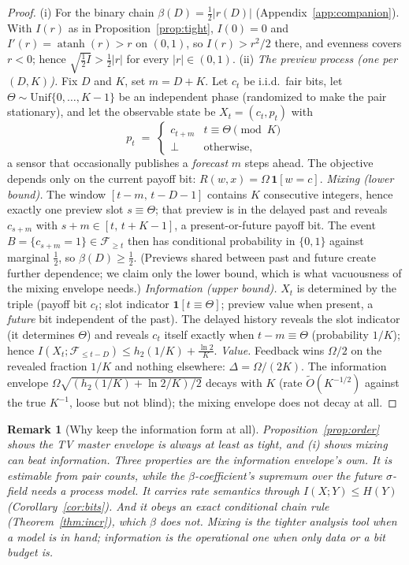 \documentclass[11pt]{article}
\newtheorem{remark}[theorem]{Remark}
\begin{document}
\begin{proof}
(i) For the binary chain $\beta(D)=\tfrac12 |r(D)|$
(Appendix~\ref{app:companion}). With $I(r)$ as in
Proposition~\ref{prop:tight}, $I(0)=0$ and
$I'(r)=\operatorname{atanh}(r)>r$ on $(0,1)$, so $I(r)>r^2/2$ there, and
evenness covers $r<0$; hence $\sqrt{\tfrac12 I}>\tfrac12|r|$ for every
$|r|\in(0,1)$.
(ii) \emph{The preview process (one per $(D,K)$).} Fix $D$ and $K$, set
$m=D+K$. Let $c_t$ be i.i.d.\ fair bits, let
$\Theta\sim\mathrm{Unif}\{0,\dots,K{-}1\}$ be an independent phase
(randomized to make the pair stationary), and let the observable state be
$X_t=(c_t,p_t)$ with
\[
p_t \;=\; \begin{cases} c_{t+m} & t\equiv\Theta \pmod K\\
\bot & \text{otherwise},\end{cases}
\]
a sensor that occasionally publishes a \emph{forecast} $m$ steps ahead. The
objective depends only on the current payoff bit:
$R(w,x)=\Omega\,\mathbf 1[w=c]$.
\emph{Mixing (lower bound).} The window $[t-m,\,t-D-1]$ contains $K$
consecutive integers, hence exactly one preview slot
$s\equiv\Theta$; that preview is in the
delayed past and reveals $c_{s+m}$ with $s+m\in[t,\,t+K-1]$, a
present-or-future payoff bit. The event $B=\{c_{s+m}=1\}\in\mathcal F_{\ge t}$
then has conditional probability in $\{0,1\}$ against marginal $\tfrac12$,
so $\beta(D)\ge\tfrac12$. (Previews shared between past and future create
further dependence; we claim only the lower bound, which is what vacuousness
of the mixing envelope needs.)
\emph{Information (upper bound).} $X_t$ is determined by the triple
(payoff bit $c_t$; slot indicator $\mathbf 1[t\equiv\Theta]$; preview value
when present, a \emph{future} bit independent of the past). The delayed
history reveals the slot indicator (it determines $\Theta$) and reveals
$c_t$ itself exactly when $t-m\equiv\Theta$ (probability $1/K$); hence
$I(X_t;\mathcal F_{\le t-D})\le h_2(1/K)+\tfrac{\ln2}{K}$.
\emph{Value.} Feedback wins $\Omega/2$ on the revealed fraction $1/K$ and
nothing elsewhere: $\Delta=\Omega/(2K)$. The information envelope
$\Omega\sqrt{(h_2(1/K)+\ln2/K)/2}$ decays with $K$ (rate
$\widetilde O(K^{-1/2})$ against the true $K^{-1}$, loose but not
blind); the mixing envelope does not decay at all.
\end{proof}

\begin{remark}[Why keep the information form at all]
Proposition~\ref{prop:order} shows the TV master envelope is always at least
as tight, and (i) shows mixing can beat information. Three properties are the
information envelope's own. It is \emph{estimable} from pair counts, while
the $\beta$-coefficient's supremum over the future $\sigma$-field needs a
process model. It \emph{carries rate semantics} through $I(X;Y)\le H(Y)$
(Corollary~\ref{cor:bits}). And it obeys an \emph{exact conditional chain
rule} (Theorem~\ref{thm:incr}), which $\beta$ does not. Mixing is the
tighter analysis tool when a model is in hand; information is the
operational one when only data or a bit budget is.
\end{remark}
\end{document}
